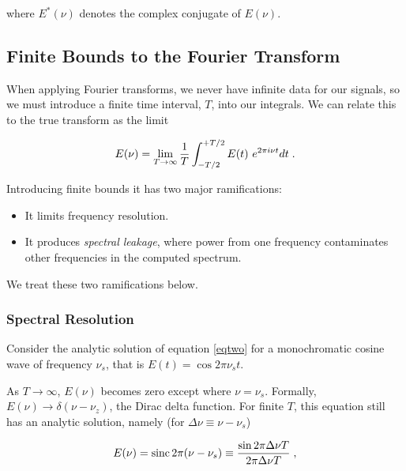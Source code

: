 \documentclass[11pt,preprint]{aastex}
\begin{document}
\noindent where $E^*(\nu)$ denotes the complex conjugate of $E(\nu)$.

\subsection{Finite Bounds to the Fourier Transform}
\label{sectiontwo}

When applying Fourier transforms, we never have infinite data for our signals, so we must
introduce a finite time interval, $T$, into our integrals. We can relate 
this to the true transform as the limit

\begin{equation} \label{eqtwo}
E(\nu) = \lim_{T \to \infty} {1 \over T}
\int_{-T/2}^{+T/2} E(t)\ e^{2 \pi i \nu t}  dt \; .
\end{equation}

\noindent
Introducing finite bounds it has two major ramifications:
\begin{itemize}

	\item It limits frequency resolution.

	\item It produces {\it spectral leakage}, where power from one
frequency contaminates other frequencies in the computed spectrum.
\end{itemize}

\noindent
We treat these two ramifications below.

\subsubsection{Spectral Resolution} \label{spctres}

\noindent
Consider the analytic solution of
equation \ref{eqtwo} for a monochromatic cosine wave of frequency
$\nu_s$, that is $E(t) = \cos 2 \pi \nu_s t$.

As $T \rightarrow \infty$, $E(\nu)$ becomes zero except where $\nu = \nu_s$.
Formally, $E(\nu)\to\delta(\nu-\nu_z)$, 
the Dirac delta function.  For finite $T$, this equation still has
an analytic solution, namely (for $\Delta\nu\equiv\nu-\nu_s$)

\begin{equation} \label{sinxoverx}
E(\nu) = {\rm sinc}\,{2\pi(\nu-\nu_s)}
\equiv\frac{\sin  2 \pi \Delta\nu T}{ 2 \pi \Delta\nu T} \; ,  
\end{equation}
%
%
\end{document}
